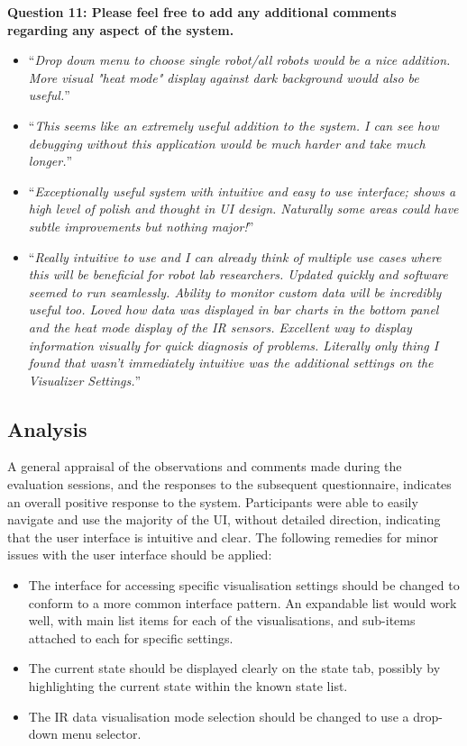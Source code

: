 \noindent\textbf{Question 11: Please feel free to add any additional comments regarding any aspect of the system.}
\begin{itemize}
 \item ``\textit{Drop down menu to choose single robot/all robots would be a nice addition. More visual "heat mode" display against dark background would also be useful.}''
 \item ``\textit{This seems like an extremely useful addition to the system. I can see how debugging without this application would be much harder and take much longer.}''
 \item ``\textit{Exceptionally useful system with intuitive and easy to use interface; shows a high level of polish and thought in UI design. Naturally some areas could have subtle improvements but nothing major!}''
 \item ``\textit{Really intuitive to use and I can already think of multiple use cases where this will be beneficial for robot lab researchers. Updated quickly and software seemed to run seamlessly. Ability to monitor custom data will be incredibly useful too. Loved how data was displayed in bar charts in the bottom panel and the heat mode display of the IR sensors. Excellent way to display information visually for quick diagnosis of problems. Literally only thing I found that wasn't immediately intuitive was the additional settings on the Visualizer Settings.}''
\end{itemize}


\subsection{Analysis}
A general appraisal of the observations and comments made during the evaluation sessions, and the responses to the subsequent questionnaire, indicates an overall positive response to the system. Participants were able to easily navigate and use the majority of the UI, without detailed direction, indicating that the user interface is intuitive and clear. The following remedies for minor issues with the user interface should be applied:

\begin{itemize}
 \item The interface for accessing specific visualisation settings should be changed to conform to a more common interface pattern. An expandable list would work well, with main list items for each of the visualisations, and sub-items attached to each for specific settings.
 \item The current state should be displayed clearly on the state tab, possibly by highlighting the current state within the known state list.
 \item The IR data visualisation mode selection should be changed to use a drop-down menu selector.
\end{itemize}

